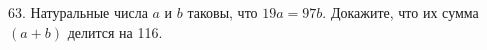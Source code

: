 63. Натуральные числа $a$ и $b$ таковы, что $19a=97b.$ Докажите, что их сумма $(a+b)$ делится на 116.\\
